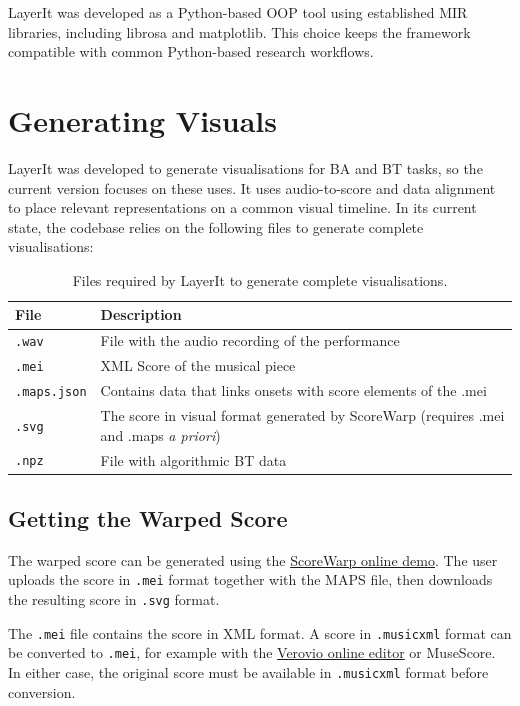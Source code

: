 LayerIt was developed as a Python-based OOP tool using established MIR libraries, including librosa and matplotlib. This choice keeps the framework compatible with common Python-based research workflows.


\section{Generating Visuals}
LayerIt was developed to generate visualisations for BA and BT tasks, so the current version focuses on these uses. It uses audio-to-score and data alignment to place relevant representations on a common visual timeline. In its current state, the codebase relies on the following files to generate complete visualisations:

\begin{table}[h]
\centering
\begin{tabular}{p{} p{}}
\hline
\textbf{File} & \textbf{Description} \\
\hline
\texttt{.wav} &  File with the audio recording of the performance \\
\texttt{.mei} &  XML Score of the musical piece\\
\texttt{.maps.json} &  Contains data that links onsets with score elements of the .mei\\
\texttt{.svg} &  The score in visual format generated by ScoreWarp (requires .mei and .maps \textit{a priori})\\
\texttt{.npz} &  File with algorithmic BT data\\
\hline
\end{tabular}
\caption[Required files for LayerIt]{Files required by LayerIt to generate complete visualisations.}
\label{tab:required-files}
\end{table} 

\subsection{Getting the Warped Score}
The warped score can be generated using the \href{https://iwk-digital.github.io/scorewarp/}{ScoreWarp online demo}. The user uploads the score in \texttt{.mei} format together with the MAPS file, then downloads the resulting score in \texttt{.svg} format.

The \texttt{.mei} file contains the score in XML format. A score in \texttt{.musicxml} format can be converted to \texttt{.mei}, for example with the \href{https://editor.verovio.org/}{Verovio online editor} or MuseScore. In either case, the original score must be available in \texttt{.musicxml} format before conversion.

